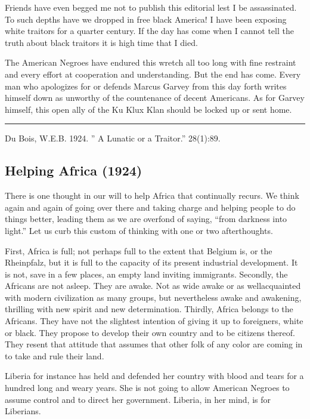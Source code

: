\documentclass[letterpaper,10pt,english]{jupyterBook}
\begin{document}
\sphinxAtStartPar
Friends have even begged me not to publish this editorial lest I be assassinated. To such depths have we dropped in free black America! I have been exposing white traitors for a quarter century. If the day has come when I cannot tell the truth about black traitors it is high time that I died.

\sphinxAtStartPar
The American Negroes have endured this wretch all too long with fine restraint and every effort at cooperation and understanding. But the end has come. Every man who apologizes for or defends Marcus Garvey from this day forth writes himself down as unworthy of the countenance of decent Americans. As for Garvey himself, this open ally of the Ku Klux Klan should be locked up or sent home.


\bigskip\hrule\bigskip


\sphinxAtStartPar
{} Du Bois, W.E.B. 1924. ” A Lunatic or a Traitor.” 28(1):8\sphinxhyphen{}9.


\subsection{Helping Africa (1924)}
\label{\detokenize{Volumes/28/03/helping_africa:helping-africa-1924}}\label{\detokenize{Volumes/28/03/helping_africa::doc}}
\sphinxAtStartPar
There is one thought in our will to help Africa that continually recurs. We think again and again of going over there and taking charge and helping people to do things better, leading them as we are overfond of saying, “from darkness into light.” Let us curb this custom of thinking with one or two after\sphinxhyphen{}thoughts.

\sphinxAtStartPar
First, Africa is full; not perhaps full to the extent that Belgium is, or the Rheinpfalz, but it is full to the capacity of its present industrial development. It is not, save in a few places, an empty land inviting immigrants. Secondly, the Africans are not asleep. They are awake. Not as wide awake or as well\sphinxhyphen{}acquainted with modern civilization as many groups, but nevertheless awake and awakening, thrilling with new spirit and new determination. Thirdly, Africa belongs to the Africans. They have not the slightest intention of giving it up to foreigners, white or black. They propose to develop their own country and to be citizens thereof. They resent that attitude that assumes that other folk of any color are coming in to take and rule their land.

\sphinxAtStartPar
Liberia for instance has held and defended her country with blood and tears for a hundred long and weary years. She is not going to allow American Negroes to assume control and to direct her government. Liberia, in her mind, is for Liberians.
\end{document}
